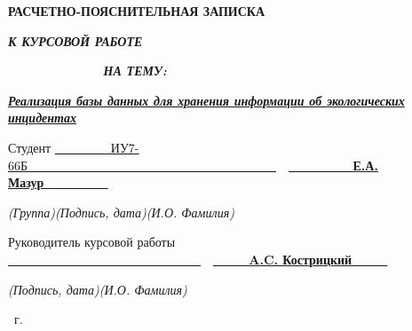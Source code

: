 \begin{titlepage}
		\begin{center}
			\noindent\begin{minipage}{\textwidth}\centering
				\LARGE\textbf{РАСЧЕТНО-ПОЯСНИТЕЛЬНАЯ ЗАПИСКА}\newline
			\end{minipage}
		\end{center}
		\begin{center}
			\noindent\begin{minipage}{\textwidth}\centering
				\Large\bfseries\textit{К КУРСОВОЙ РАБОТЕ}

				\Large\bfseries\textit{~~~~~~~~~~~~~НА ТЕМУ:}\newline
				
			\end{minipage}
		\end{center}
		
		\noindent\Large\textbf{\textit{\uline{Реализация базы данных для хранения информации об экологических инцидентах \hfill}}}
		
		\noindent\uline\hfill
		
		\noindent\uline\hfill
		
		
		\noindent\uline\hfill\newline
		
		
		\noindent\normalsize\textrm{Студент} \uline{~~~~~~~~~ИУ7-66Б~~~~~~~~~}\hspace{3cm}\uline{~~~~~~~~~~~~~~~~~~~~~~~~~~~~~~~}~~\textbf{\uline{~~~~~~~~~Е.А. Мазур~~~~~~~~~}}
		
		\noindent\footnotesize\textsl{\hspace{3cm}(Группа)\hspace{4.9cm}(Подпись, дата)\hspace{1.8cm}(И.О. Фамилия)}\newline
		
		\noindent\normalsize\textrm{Руководитель курсовой работы~~} \hspace{2.35cm}\uline{~~~~~~~~~~~~~~~~~~~~~~~~~~~~~~~}~~\textbf{\uline{~~~~~A.C. Кострицкий~~~~~}}
		
		\noindent\footnotesize\textsl{\hspace{9.3cm}(Подпись, дата)\hspace{1.8cm}(И.О. Фамилия)}\newline
		
		\begin{center}
			\vfill
			\the\year ~г.
		\end{center}
		\restoregeometry
	\end{titlepage}